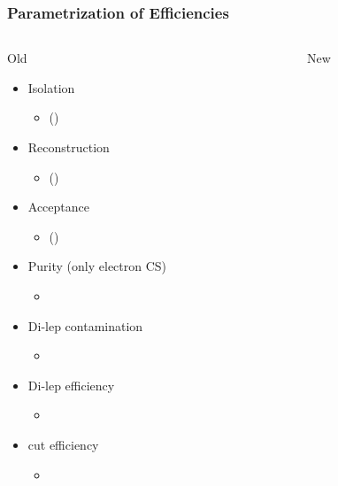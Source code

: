 \documentclass{beamer}
\begin{document}
\begin{frame}
\frametitle{Parametrization of Efficiencies}
  \begin{columns}
    \begin{column}{0.5\textwidth}
     \centering
     Old
     \begin{itemize}




        \item Isolation 
   \begin{itemize}
    \item \HT \MHT \NJets (\BTags)
   \end{itemize}
   \item Reconstruction 
   \begin{itemize}
    \item \HT \MHT \NJets (\BTags)
   \end{itemize}
   \item Acceptance 
   \begin{itemize}
    \item \MHT \NJets (\BTags)
   \end{itemize}
   \item Purity (only electron CS)
   \begin{itemize}
    \item \MHT \NJets 
   \end{itemize}
      \item Di-lep contamination
   \begin{itemize}
    \item \MHT \NJets 
   \end{itemize}
   \item Di-lep efficiency
   \begin{itemize}
    \item \NJets 
   \end{itemize}
   \item \mt cut efficiency
   \begin{itemize}
    \item \NJets 
   \end{itemize}
     \end{itemize}
    \end{column}
    \begin{column}{0.5\textwidth}
      \centering
      New
             \begin{itemize}



\end{itemize}
\end{column}
\end{columns}
\end{frame}
\end{document}
